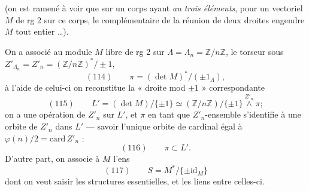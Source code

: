 \documentclass[11pt,a4paper]{article}
\begin{document}

(on est ramené à voir que sur un corps  ayant
\emph{au  trois éléments}, pour un vectoriel $M$ de rg 2 sur ce
corps, le  complémentaire de la réunion de deux droites engendre
$M$ tout entier …).

On a associé au module $M$ libre de rg 2 sur $\Lambda=\Lambda_n=\mathbb{Z}/n\mathbb{Z}$,
le torseur sous $Z'_{\Lambda_n}=Z'_n=(\mathbb{Z}/n\mathbb{Z})^{*}/\pm 1$,
\[
  (114)\qquad \pi = (\det M)^{*}/(\pm 1_{\Lambda}),
\]
à l'aide de celui-ci on reconstitue la « droite mod $\pm 1$ » correspondante
\[
  (115)\qquad L' = (\det M)/\{\pm 1\} \simeq
  (\mathbb{Z}/n\mathbb{Z})/\{\pm 1\} \overset{Z'_n}{\wedge} \pi ;
\]
on a une opération de $Z'_n$ sur $L'$, et $\pi$ en tant que $Z'_n$-ensemble
s'identifie à une orbite de $Z'_n$ dans $L'$ — savoir  l'unique orbite de
cardinal égal à $\varphi(n)/2=\mathrm{card}\, Z'_n$ :
\[
  (116)\qquad \pi \subset L' .
\]
D'autre part, on associe à $M$ l'ens
\[
  (117)\qquad S = M^{*}/\{\pm \mathrm{id}_M\}
\]
dont on veut saisir les structures essentielles, et les liens entre celles-ci.

\end{document}
